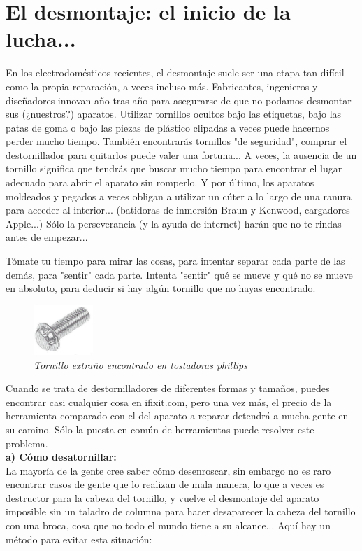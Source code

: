 \documentclass[a5paper,twoside,openany]{book}
\begin{document}
\section{El desmontaje: el inicio de la lucha...}
En los electrodomésticos recientes, el desmontaje suele ser una etapa tan difícil como la propia reparación, a veces incluso más. Fabricantes, ingenieros y diseñadores innovan año tras año para asegurarse de que no podamos desmontar sus (¿nuestros?) aparatos.
Utilizar tornillos ocultos bajo las etiquetas, bajo las patas de goma o bajo las piezas de plástico clipadas a veces puede hacernos perder mucho tiempo. También encontrarás tornillos "de seguridad", comprar el destornillador para quitarlos puede valer una fortuna...
A veces, la ausencia de un tornillo significa que tendrás que buscar mucho tiempo para encontrar el lugar adecuado para abrir el aparato sin romperlo.
Y por último, los aparatos moldeados y pegados a veces obligan a utilizar un cúter a lo largo de una ranura para acceder al interior... (batidoras de inmersión Braun y Kenwood, cargadores Apple...) Sólo la perseverancia (y la ayuda de internet) harán que no te rindas antes de empezar...

Tómate tu tiempo para mirar las cosas, para intentar separar cada parte de las demás, para "sentir" cada parte. Intenta "sentir" qué se mueve y qué no se mueve en absoluto, para deducir si hay algún tornillo que no hayas encontrado.

\begin{figure}[h]
\includegraphics[width=0.2\textwidth]{tornillo-tostadora-phillips} 
\centering
\caption*{\textit{Tornillo extraño encontrado en tostadoras phillips}}
\end{figure}

Cuando se trata de destornilladores de diferentes formas y tamaños, puedes encontrar casi cualquier cosa en ifixit.com, pero una vez más, el precio de la herramienta comparado con el del aparato a reparar detendrá a mucha gente en su camino. Sólo la puesta en común de herramientas puede resolver este problema.\\

{\large \textbf{a) Cómo desatornillar:}}\\

La mayoría de la gente cree saber cómo desenroscar, sin embargo no es raro encontrar casos de gente que lo realizan de mala manera, lo que a veces es destructor para la cabeza del tornillo, y vuelve el desmontaje del aparato imposible sin un taladro de columna para hacer desaparecer la cabeza del tornillo con una broca, cosa que no todo el mundo tiene a su alcance...
Aquí hay un método para evitar esta situación:
\end{document}
